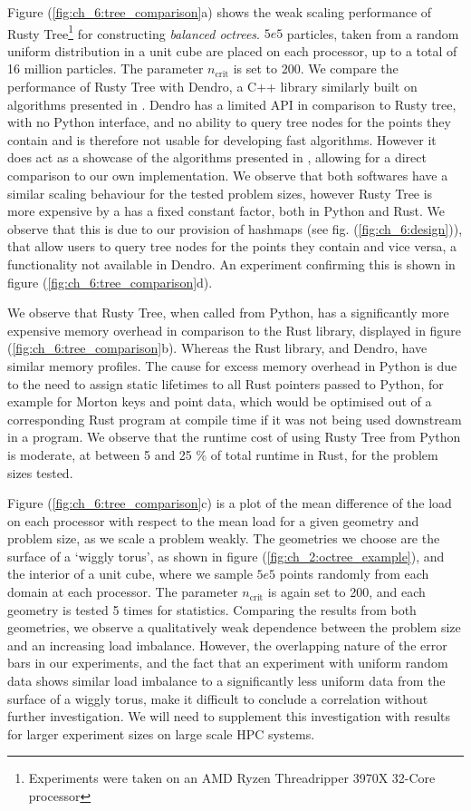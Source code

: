 Figure (\ref{fig:ch_6:tree_comparison}a) shows the weak scaling performance of Rusty Tree\footnote{Experiments were taken on an AMD Ryzen Threadripper 3970X 32-Core processor} for constructing \textit{balanced octrees}. $5e5$ particles, taken from a random uniform distribution in a unit cube are placed on each processor, up to a total of 16 million particles. The parameter $n_{\text{crit}}$ is set to 200. We compare the performance of Rusty Tree with Dendro, a C++ library similarly built on algorithms presented in \cite{sundar2008bottom}. Dendro has a limited API in comparison to Rusty tree, with no Python interface, and no ability to query tree nodes for the points they contain and is therefore not usable for developing fast algorithms. However it does act as a showcase of the algorithms presented in \cite{sundar2008bottom}, allowing for a direct comparison to our own implementation. We observe that both softwares have a similar scaling behaviour for the tested problem sizes, however Rusty Tree is more expensive by a has a fixed constant factor, both in Python and Rust. We observe that this is due to our provision of hashmaps (see fig. (\ref{fig:ch_6:design})), that allow users to query tree nodes for the points they contain and vice versa, a functionality not available in Dendro. An experiment confirming this is shown in figure (\ref{fig:ch_6:tree_comparison}d).

We observe that Rusty Tree, when called from Python, has a significantly more expensive memory overhead in comparison to the Rust library, displayed in figure (\ref{fig:ch_6:tree_comparison}b). Whereas the Rust library, and Dendro, have similar memory profiles. The cause for excess memory overhead in Python is due to the need to assign static lifetimes to all Rust pointers passed to Python, for example for Morton keys and point data, which would be optimised out of a corresponding Rust program at compile time if it was not being used downstream in a program. We observe that the runtime cost of using Rusty Tree from Python is moderate, at between 5 and 25 \% of total runtime in Rust, for the problem sizes tested. 

Figure (\ref{fig:ch_6:tree_comparison}c) is a plot of the mean difference of the load on each processor with respect to the mean load for a given geometry and problem size, as we scale a problem weakly. The geometries we choose are the surface of a `wiggly torus', as shown in figure (\ref{fig:ch_2:octree_example}), and the interior of a unit cube, where we sample $5e5$ points randomly from each domain at each processor. The parameter $n_{\text{crit}}$ is again set to 200, and each geometry is tested 5 times for statistics. Comparing the results from both geometries, we observe a qualitatively weak dependence between the problem size and an increasing load imbalance. However, the overlapping nature of the error bars in our experiments, and the fact that an experiment with uniform random data shows similar load imbalance to a significantly less uniform data from the surface of a wiggly torus, make it difficult to conclude a correlation without further investigation. We will need to supplement this investigation with results for larger experiment sizes on large scale HPC systems.

